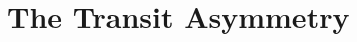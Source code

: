 \documentclass[12pt,modern,twocolumn,tighten]{aastex63}
\newcommand{\cn}{$\delta$\ Lyr\ cluster} %
\newcommand{\bpmrpo}{(G_{\rm BP}-G_{\rm RP})_0}
\begin{document}
% 
% 
% 
% 



\section{The Transit Asymmetry}
\label{app:asymmetry}
\end{document}
